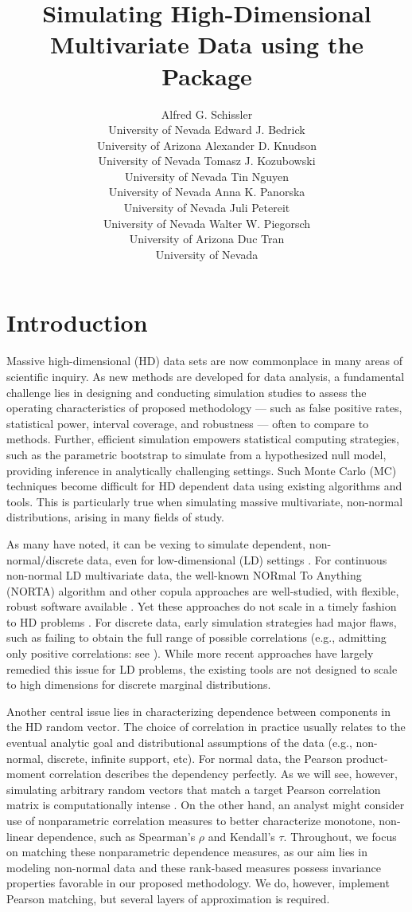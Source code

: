 \documentclass[
]{jss}
\author{
Alfred G. Schissler\\University of Nevada \And Edward J.
Bedrick\\University of Arizona \And Alexander D. Knudson\\University of
Nevada \AND Tomasz J. Kozubowski\\University of Nevada \And Tin
Nguyen\\University of Nevada \And Anna K. Panorska\\University of Nevada
\AND Juli Petereit\\University of Nevada \And Walter W.
Piegorsch\\University of Arizona \And Duc Tran\\University of Nevada
}
\title{Simulating High-Dimensional Multivariate Data using the
\pkg{bigsimr} Package}
\begin{document}
\newpage


\hypertarget{introduction}{%
\section{Introduction}\label{introduction}}

Massive high-dimensional (HD) data sets are now commonplace in many
areas of scientific inquiry. As new methods are developed for data
analysis, a fundamental challenge lies in designing and conducting
simulation studies to assess the operating characteristics of proposed
methodology --- such as false positive rates, statistical power,
interval coverage, and robustness --- often to compare to methods.
Further, efficient simulation empowers statistical computing strategies,
such as the parametric bootstrap \citep{Chernick2008} to simulate from a
hypothesized null model, providing inference in analytically challenging
settings. Such Monte Carlo (MC) techniques become difficult for HD
dependent data using existing algorithms and tools. This is particularly
true when simulating massive multivariate, non-normal distributions,
arising in many fields of study.

As many have noted, it can be vexing to simulate dependent,
non-normal/discrete data, even for low-dimensional (LD) settings
\citep{MB13, XZ19}. For continuous non-normal LD multivariate data, the
well-known NORmal To Anything (NORTA) algorithm \citep{Cario1997} and
other copula approaches \citep{Nelsen2007} are well-studied, with
flexible, robust software available \citep{Yan2007, Chen2001}. Yet these
approaches do not scale in a timely fashion to HD problems
\citep{Li2019gpu}. For discrete data, early simulation strategies had
major flaws, such as failing to obtain the full range of possible
correlations (e.g., admitting only positive correlations: see
\citet{Park1996}). While more recent approaches
\citep{MB13, Xia17, BF17} have largely remedied this issue for LD
problems, the existing tools are not designed to scale to high
dimensions for discrete marginal distributions.

Another central issue lies in characterizing dependence between
components in the HD random vector. The choice of correlation in
practice usually relates to the eventual analytic goal and
distributional assumptions of the data (e.g., non-normal, discrete,
infinite support, etc). For normal data, the Pearson product-moment
correlation describes the dependency perfectly. As we will see, however,
simulating arbitrary random vectors that match a target Pearson
correlation matrix is computationally intense \citep{Chen2001, Xia17}.
On the other hand, an analyst might consider use of nonparametric
correlation measures to better characterize monotone, non-linear
dependence, such as Spearman's \(\rho\) and Kendall's \(\tau\).
Throughout, we focus on matching these nonparametric dependence
measures, as our aim lies in modeling non-normal data and these
rank-based measures possess invariance properties favorable in our
proposed methodology. We do, however, implement Pearson matching, but
several layers of approximation is required.
\end{document}
